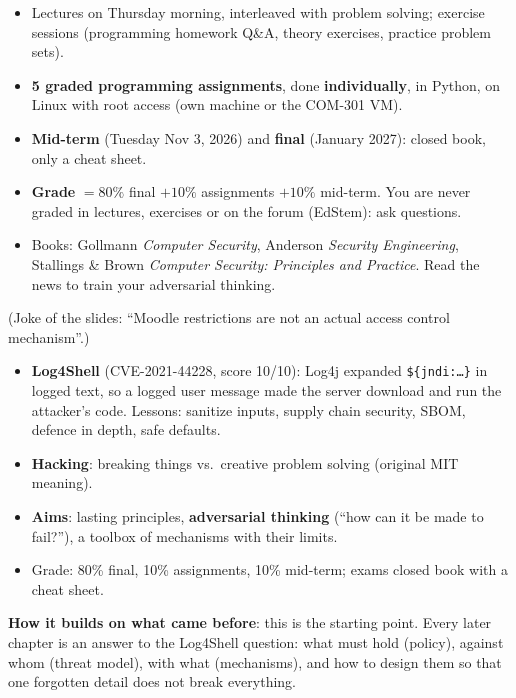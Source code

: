 \begin{rembox}[title=Course organisation]
\begin{itemize}
  \item Lectures on Thursday morning, interleaved with problem solving; exercise sessions
        (programming homework Q\&A, theory exercises, practice problem sets).
  \item \textbf{5 graded programming assignments}, done \textbf{individually}, in Python, on Linux
        with root access (own machine or the COM-301 VM).
  \item \textbf{Mid-term} (Tuesday Nov 3, 2026) and \textbf{final} (January 2027): closed book,
        only a cheat sheet.
  \item \textbf{Grade} $= 80\%$ final $+ 10\%$ assignments $+ 10\%$ mid-term. You are never
        graded in lectures, exercises or on the forum (EdStem): ask questions.
  \item Books: Gollmann \emph{Computer Security}, Anderson \emph{Security Engineering}, Stallings
        \& Brown \emph{Computer Security: Principles and Practice}. Read the news to train your
        adversarial thinking.
\end{itemize}
(Joke of the slides: ``Moodle restrictions are not an actual access control mechanism''.)
\end{rembox}

\begin{recapbox}[title={Exam-ready recap --- Lecture 0: Preliminaries}]
\begin{itemize}
  \item \textbf{Log4Shell} (CVE-2021-44228, score 10/10): Log4j expanded \texttt{\$\{jndi:\ldots\}}
        in logged text, so a logged user message made the server download and run the
        attacker's code. Lessons: sanitize inputs, supply chain security, SBOM, defence in depth,
        safe defaults.
  \item \textbf{Hacking}: breaking things vs.\ creative problem solving (original MIT meaning).
  \item \textbf{Aims}: lasting principles, \textbf{adversarial thinking} (``how can it be made to
        fail?''), a toolbox of mechanisms with their limits.
  \item Grade: 80\% final, 10\% assignments, 10\% mid-term; exams closed book with a cheat sheet.
\end{itemize}
\textbf{How it builds on what came before}: this is the starting point. Every later chapter is an
answer to the Log4Shell question: what must hold (policy), against whom (threat model), with what
(mechanisms), and how to design them so that one forgotten detail does not break everything.
\end{recapbox}
